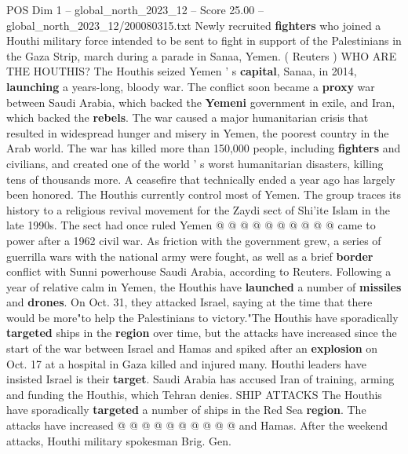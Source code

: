 \begin{textsample}{POS Dim 1 – global\_north\_2023\_12 – Score 25.00 – global\_north\_2023\_12/200080315.txt}  \label{ex:f1_pos_251}
Newly recruited \textbf{fighters} who joined a Houthi military force intended to be sent to fight in support of the Palestinians in the Gaza Strip, march during a parade in Sanaa, Yemen. ( Reuters ) WHO ARE THE HOUTHIS?
The Houthis seized Yemen ' s \textbf{capital}, Sanaa, in 2014, \textbf{launching} a years-long, bloody war.
The conflict soon became a \textbf{proxy} war between Saudi Arabia, which backed the \textbf{Yemeni} government in exile, and Iran, which backed the \textbf{rebels}.
The war caused a major humanitarian crisis that resulted in widespread hunger and misery in Yemen, the poorest country in the Arab world.
The war has killed more than 150,000 people, including \textbf{fighters} and civilians, and created one of the world ' s worst humanitarian disasters, killing tens of thousands more.
A ceasefire that technically ended a year ago has largely been honored.
The Houthis currently control most of Yemen.
The group traces its history to a religious revival movement for the Zaydi sect of Shi'ite Islam in the late 1990s.
The sect had once ruled Yemen @ @ @ @ @ @ @ @ @ @ came to power after a 1962 civil war.
As friction with the government grew, a series of guerrilla wars with the national army were fought, as well as a brief \textbf{border} conflict with Sunni powerhouse Saudi Arabia, according to Reuters.
Following a year of relative calm in Yemen, the Houthis have \textbf{launched} a number of \textbf{missiles} and \textbf{drones}.
On Oct. 31, they attacked Israel, saying at the time that there would be more"to help the Palestinians to victory."The Houthis have sporadically \textbf{targeted} ships in the \textbf{region} over time, but the attacks have increased since the start of the war between Israel and Hamas and spiked after an \textbf{explosion} on Oct. 17 at a hospital in Gaza killed and injured many.
Houthi leaders have insisted Israel is their \textbf{target}.
Saudi Arabia has accused Iran of training, arming and funding the Houthis, which Tehran denies.
SHIP ATTACKS The Houthis have sporadically \textbf{targeted} a number of ships in the Red Sea \textbf{region}.
The attacks have increased @ @ @ @ @ @ @ @ @ @ and Hamas.
After the weekend attacks, Houthi military spokesman Brig.
Gen.

\end{textsample}
